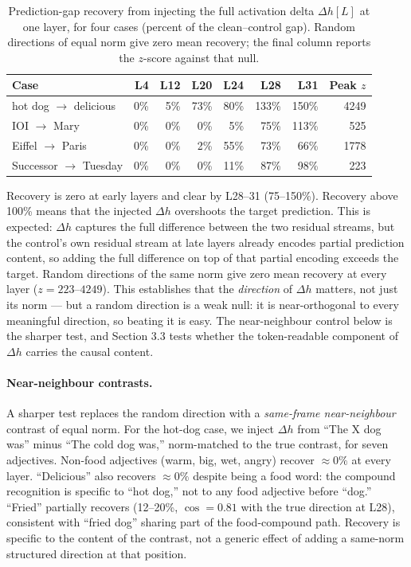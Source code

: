 \documentclass[11pt]{article}
\newcommand{\dhh}{\Delta h}
\begin{document}
\begin{table}[htbp]
\centering
\small
\begin{tabular}{lrrrrrrr}
\toprule
Case & L4 & L12 & L20 & L24 & L28 & L31 & Peak $z$ \\
\midrule
hot dog $\rightarrow$ delicious & 0\% & 5\% & 73\% & 80\% & 133\% & 150\% & 4249 \\
IOI $\rightarrow$ Mary & 0\% & 0\% & 0\% & 5\% & 75\% & 113\% & 525 \\
Eiffel $\rightarrow$ Paris & 0\% & 0\% & 2\% & 55\% & 73\% & 66\% & 1778 \\
Successor $\rightarrow$ Tuesday & 0\% & 0\% & 0\% & 11\% & 87\% & 98\% & 223 \\
\bottomrule
\end{tabular}
\caption{Prediction-gap recovery from injecting the full activation delta $\dhh[L]$ at one layer, for four cases (percent of the clean--control gap). Random directions of equal norm give zero mean recovery; the final column reports the $z$-score against that null.}
\label{tab:recovery}
\end{table}

Recovery is zero at early layers and clear by L28--31 (75--150\%).
Recovery above 100\% means that the injected $\dhh$ overshoots the
target prediction. This is expected: $\dhh$ captures the full
difference between the two residual streams, but the control's own
residual stream at late layers already encodes partial prediction
content, so adding the full difference on top of that partial encoding
exceeds the target.
Random directions of the same norm give zero mean recovery at every layer
($z = 223$--$4249$). This establishes that the \emph{direction} of $\dhh$ matters, not
just its norm --- but a random direction is a weak null: it is near-orthogonal
to every meaningful direction, so beating it is easy. The near-neighbour
control below is the sharper test, and Section 3.3 tests whether the
token-readable component of $\dhh$ carries the causal content.

\paragraph{Near-neighbour contrasts.} A sharper test replaces the random
direction with a \emph{same-frame near-neighbour} contrast of equal norm.
For the hot-dog case, we inject $\dhh$ from ``The X dog was'' minus ``The
cold dog was,'' norm-matched to the true contrast, for seven adjectives.
Non-food adjectives (warm, big, wet, angry) recover $\approx 0\%$ at every
layer. ``Delicious'' also recovers $\approx 0\%$ despite being a food word:
the compound recognition is specific to ``hot dog,'' not to any food
adjective before ``dog.'' ``Fried'' partially recovers (12--20\%,
$\cos = 0.81$ with the true direction at L28), consistent with ``fried
dog'' sharing part of the food-compound path. Recovery is specific to the
content of the contrast, not a generic effect of adding a same-norm
structured direction at that position.
\end{document}
